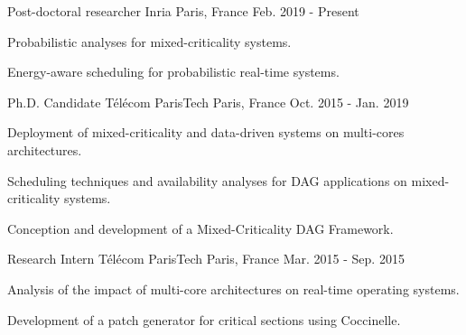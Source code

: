 


\begin{cventries}


\cventry
{Post-doctoral researcher} %
{Inria} %
{Paris, France} %
{Feb. 2019 - Present} %
{ %
\begin{cvitems}
\item {Probabilistic analyses for mixed-criticality systems.}
\item {Energy-aware scheduling for probabilistic real-time systems.}
\end{cvitems}
}


\cventry
{Ph.D. Candidate} %
{Télécom ParisTech} %
{Paris, France} %
{Oct. 2015 - Jan. 2019} %
{ %
\begin{cvitems}
\item {Deployment of mixed-criticality and data-driven systems on multi-cores 
architectures.}
\item {Scheduling techniques and availability analyses for DAG applications on 
mixed-criticality systems.}
\item {Conception and development of a Mixed-Criticality DAG Framework.}
\end{cvitems}
}


\cventry
{Research Intern} %
{Télécom ParisTech} %
{Paris, France} %
{Mar. 2015 - Sep. 2015} %
{ %
\begin{cvitems}
\item {Analysis of the impact of multi-core architectures on real-time 
operating systems.}
\item {Development of a patch generator for critical sections using Coccinelle.}
\end{cvitems} 
}


\end{cventries}
